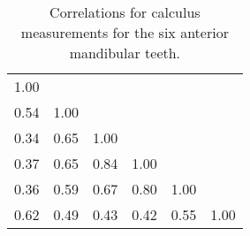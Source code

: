 
\begin{center}
\begin{longtable}{cccccc}
\caption{Correlations for calculus measurements for the six anterior
         mandibular teeth.} \\
\hline
1.00 & & & & & \\
0.54 & 1.00 & & & & \\
0.34 & 0.65 & 1.00 & & & \\
0.37 & 0.65 & 0.84 & 1.00 & & \\
0.36 & 0.59 & 0.67 & 0.80 & 1.00 & \\
0.62 & 0.49 & 0.43 & 0.42 & 0.55 & 1.00 \\
\hline
\end{longtable}
\end{center}
